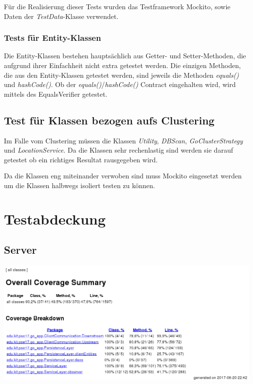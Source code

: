 \documentclass[11pt,a4paper]{scrartcl}
\begin{document}
Für die Realisierung dieser Tests wurden das Testframework Mockito, sowie Daten der \textit{TestData}-Klasse verwendet.

\subsubsection{Tests für Entity-Klassen}
Die Entity-Klassen bestehen hauptsächlich aus Getter- und Setter-Methoden, die aufgrund ihrer Einfachheit nicht extra getestet werden. Die einzigen Methoden, die aus den Entity-Klassen getestet werden, sind jeweils die Methoden \textit{equals()} und \textit{hashCode()}. Ob der \textit{equals()}/\textit{hashCode()} Contract eingehalten wird, wird mittels des EqualsVerifier getestet.

\subsection{Test für Klassen bezogen aufs Clustering}
Im Falle vom Clustering müssen die Klassen \textit{Utility}, \textit{DBScan}, \textit{GoClusterStrategy} und \textit{LocationService}. Da die Klassen sehr rechenlastig sind werden sie darauf getestet ob ein richtiges Resultat rausgegeben wird.

Da die Klassen eng miteinander verwoben sind muss Mockito eingesetzt werden um die Klassen halbwegs isoliert testen zu können.

\newpage

\section{Testabdeckung}
\subsection{Server}


\begin{center}
	\includegraphics[width=1.0\linewidth]{ServerTestCoverage}
\end{center}
\end{document}
